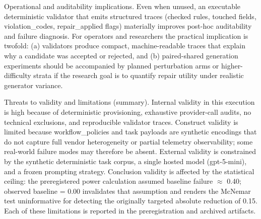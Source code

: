 \documentclass[conference]{IEEEtran}
\begin{document}
Operational and auditability implications. Even when unused, an executable deterministic validator that emits structured traces (checked rules, touched fields, violation\_codes, repair\_applied flags) materially improves post-hoc auditability and failure diagnosis. For operators and researchers the practical implication is twofold: (a) validators produce compact, machine-readable traces that explain why a candidate was accepted or rejected, and (b) paired-shared generation experiments should be accompanied by planned perturbation arms or higher-difficulty strata if the research goal is to quantify repair utility under realistic generator variance.

Threats to validity and limitations (summary). Internal validity in this execution is high because of deterministic provisioning, exhaustive provider-call audits, no technical exclusions, and reproducible validator traces. Construct validity is limited because workflow\_policies and task payloads are synthetic encodings that do not capture full vendor heterogeneity or partial telemetry observability; some real-world failure modes may therefore be absent. External validity is constrained by the synthetic deterministic task corpus, a single hosted model (gpt-5-mini), and a frozen prompting strategy. Conclusion validity is affected by the statistical ceiling: the preregistered power calculation assumed baseline failure \ensuremath{\approx} 0.40; observed baseline = 0.00 invalidates that assumption and renders the McNemar test uninformative for detecting the originally targeted absolute reduction of 0.15. Each of these limitations is reported in the preregistration and archived artifacts.
\end{document}
